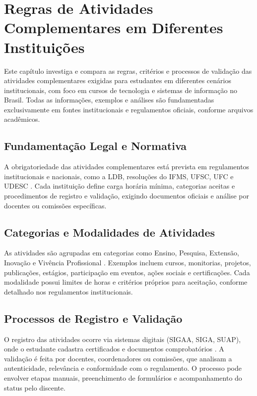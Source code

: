 \chapter{Regras de Atividades Complementares em Diferentes Instituições}

Este capítulo investiga e compara as regras, critérios e processos de validação das atividades complementares exigidas para estudantes em diferentes cenários institucionais, com foco em cursos de tecnologia e sistemas de informação no Brasil. Todas as informações, exemplos e análises são fundamentadas exclusivamente em fontes institucionais e regulamentos oficiais, conforme arquivos acadêmicos.

\section{Fundamentação Legal e Normativa}
A obrigatoriedade das atividades complementares está prevista em regulamentos institucionais e nacionais, como a LDB, resoluções do IFMS, UFSC, UFC e UDESC \cite{ufsc_sistemas_2024, bayde_ribeiro_sistemas_2022, udesc_atividades_2012}. Cada instituição define carga horária mínima, categorias aceitas e procedimentos de registro e validação, exigindo documentos oficiais e análise por docentes ou comissões específicas.

\section{Categorias e Modalidades de Atividades}
As atividades são agrupadas em categorias como Ensino, Pesquisa, Extensão, Inovação e Vivência Profissional \cite{ufsc_sistemas_2024, bayde_ribeiro_sistemas_2022, udesc_atividades_2012}. Exemplos incluem cursos, monitorias, projetos, publicações, estágios, participação em eventos, ações sociais e certificações. Cada modalidade possui limites de horas e critérios próprios para aceitação, conforme detalhado nos regulamentos institucionais.

\section{Processos de Registro e Validação}
O registro das atividades ocorre via sistemas digitais (SIGAA, SIGA, SUAP), onde o estudante cadastra certificados e documentos comprobatórios \cite{bayde_ribeiro_sistemas_2022, udesc_atividades_2012}. A validação é feita por docentes, coordenadores ou comissões, que analisam a autenticidade, relevância e conformidade com o regulamento. O processo pode envolver etapas manuais, preenchimento de formulários e acompanhamento do status pelo discente.

